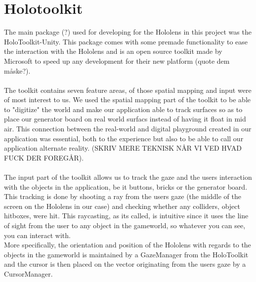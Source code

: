 
\section{Holotoolkit}
The main package (?) used for developing for the Hololens in this project was the HoloToolkit-Unity. This package comes with some premade functionality to ease the interaction with the Hololens and is an open source toolkit made by Microsoft to speed up any development for their new platform (quote dem måske?).\\
\\
The toolkit contains seven feature areas, of those spatial mapping and input were of most interest to us. We used the spatial mapping part of the toolkit to be able to "digitize" the world and make our application able to track surfaces so as to place our generator board on real world surfacs instead of having it float in mid air. This connection between the real-world and digital playground created in our application was essential, both to the experience but also to be able to call our application alternate reality. (SKRIV MERE TEKNISK NÅR VI VED HVAD FUCK DER FOREGÅR).\\
\\
The input part of the toolkit allows us to track the gaze and the users interaction with the objects in the application, be it buttons, bricks or the generator board. This tracking is done by shooting a ray from the users gaze (the middle of the screen on the Hololens in our case) and checking whether any colliders, object hitboxes, were hit. This raycasting, as its called, is intuitive since it uses the line of sight from the user to any object in the gameworld, so whatever you can see, you can interact with.\\
More specifically, the orientation and position of the Hololens with regards to the objects in the gameworld is maintained by a GazeManager from the HoloToolkit and the cursor is then placed on the vector originating from the users gaze by a CursorManager. 